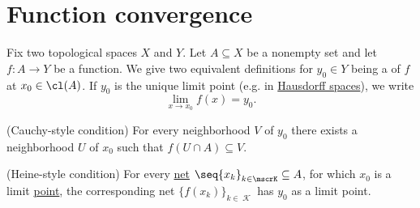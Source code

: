 \section{Function convergence}\label{sec:function_convergence}

\begin{definition}\label{def:local_convergence}
  Fix two topological spaces \( X \) and \( Y \). Let \( A \subseteq X \) be a nonempty set and let \( f: A \to Y \) be a function. We give two equivalent definitions for \( y_0 \in Y \) being a  of \( f \) at \( x_0 \in \cl(A) \). If \( y_0 \) is the unique limit point (e.g. in \hyperref[def:separation_axioms/T2]{Hausdorff spaces}), we write
  \begin{equation*}
    \lim_{x \to x_0} f(x) = y_0.
  \end{equation*}

  \begin{thmenum}
    (Cauchy-style condition) For every neighborhood \( V \) of \( y_0 \) there exists a neighborhood \( U \) of \( x_0 \) such that \( f(U \cap A) \subseteq V \).

    (Heine-style condition) For every \hyperref[def:topological_net]{net} \( \seq{ x_k }_{k \in \mscrK} \subseteq A \), for which \( x_0 \) is a limit \hyperref[def:net_limit_point]{point}, the corresponding net \( \{ f(x_k) \}_{k \in \mscrK} \) has \( y_0 \) as a limit point.
  \end{thmenum}
\end{definition}
